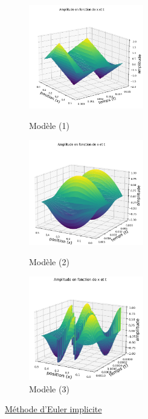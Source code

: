 \begin{figure}[H]
  \includegraphics[width=5cm]{1.png}
  \caption{Modèle (1)}\label{fig}
\endminipage\hfill
{}
  \includegraphics[width=5cm]{2.png}
  \caption{Modèle (2)}\label{fig}
\endminipage\hfill
{}%
  \includegraphics[width=5cm]{7_explicite.png}
  \caption{Modèle (3)}\label{fig}
\endminipage
\end{figure}



\underline{Méthode d'Euler implicite}

